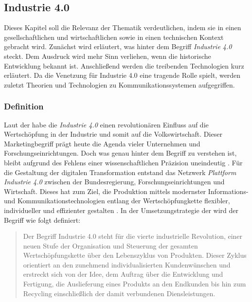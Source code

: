 \subsection{Industrie 4.0}
Dieses Kapitel soll die Relevanz der Thematik verdeutlichen, indem sie in einen gesellschaftlichen und wirtschaftlichen sowie in einen technischen Kontext gebracht wird. Zunächst wird erläutert, was hinter dem Begriff \textit{Industrie 4.0} steckt. Dem Ausdruck wird mehr Sinn verliehen, wenn die historische Entwicklung bekannt ist. Anschließend werden die treibenden Technologien kurz erläutert. Da die Venetzung für Industrie 4.0 eine tragende Rolle spielt, werden zuletzt Theorien und Technologien zu Kommunikationssystemen aufgegriffen.
\subsubsection{Definition}

Laut der \cite{FraunhoferGesellschaft2016} habe die \textit{Industrie 4.0} einen revolutionären Einfluss auf die Wertschöpfung in der Industrie und somit auf die Volkswirtschaft. Dieser Marketingbegriff prägt heute die Agenda vieler Unternehmen und Forschungseinrichtungen. Doch was genau hinter dem Begriff zu verstehen ist, bleibt aufgrund des Fehlens einer  \glqq wissenschaftlichen Präzision\grqq{} uneindeutig \citep{Bendel2019}. Für die Gestaltung der digitalen Transformation entstand das Netzwerk \textit{Plattform Industrie 4.0} zwischen der Bundesregierung, Forschungseinrichtungen und Wirtschaft. Dieses hat zum Ziel, die Produktion mittels modernster Informations- und Kommunikationstechnologien entlang der Wertschöpfungkette \glqq flexibler, individueller und effizienter\grqq{} gestalten \citep{BWE2019}. In der Umsetzungstrategie der \citet[S. 8]{BITKOM2015} wird der Begriff wie folgt definiert:

\begin{quotation} \noindent \glqq Der Begriff Industrie 4.0 steht für die vierte industrielle Revolution, einer neuen Stufe der Organisation und Steuerung der gesamten Wertschöpfungskette über den Lebenszyklus von Produkten. Dieser Zyklus orientiert an den zunehmend individualisierten Kundenwünschen und erstreckt sich von der Idee, dem Auftrag über die Entwicklung und Fertigung, die Auslieferung eines Produkts an den Endkunden bis hin zum Recycling einschließlich der damit verbundenen Diensleistungen.\grqq{}
\end{quotation}

